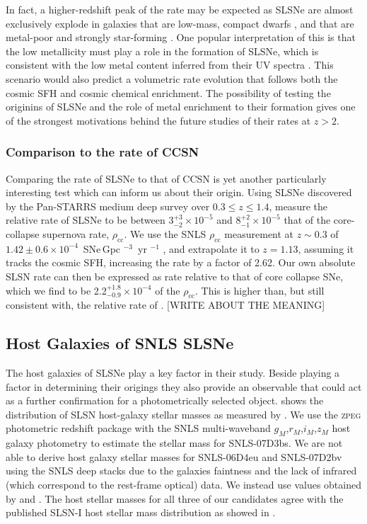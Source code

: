 In fact, a higher-redshift peak of the rate may be expected as SLSNe are almost exclusively explode in galaxies that are low-mass, compact dwarfs \citep{2011ApJ...727...15N,2015ApJ...804...90L}, and that are metal-poor and strongly star-forming \citep{2013ApJ...771...97L,2013ApJ...763L..28C,2015MNRAS.449..917L}. One popular interpretation of this is that the low metallicity must play a role in the formation of SLSNe, which is consistent with the low metal content inferred from their UV spectra \citep{Mazzalli2016}. This scenario would also predict a volumetric rate evolution that follows both the cosmic SFH and cosmic chemical enrichment. The possibility of testing the originins of SLSNe and the role of metal enrichment to their formation gives one of the strongest motivations behind the future studies of their rates at $z>2$.

\subsubsection{Comparison to the rate of CCSN}
Comparing the rate of SLSNe to that of CCSN is yet another particularly interesting test which can inform us about their origin. Using SLSNe discovered by the Pan-STARRS medium deep survey over $0.3 \leq z \leq 1.4$, \citet{McCrum2015} measure the relative rate of SLSNe to be between $3^{+3}_{-2}\times10^{-5}$ and $8^{+2}_{-1}\times10^{-5}$ that of the core-collapse supernova rate, $\rho_{\mathrm{cc}}$. We use the SNLS $\rho_{\mathrm{cc}}$ measurement at $z\sim0.3$ of $1.42\pm0.6\times10^{-4}$ \,SNe\,Gpc $^{-3}$ \,yr $^{-1}$ \citep{2009A&A...499..653B}, and extrapolate it to $z=1.13$, assuming it tracks the cosmic SFH, increasing the rate by a factor of 2.62. Our own absolute SLSN rate can then be expressed as rate relative to that of core collapse SNe, which we find to be 2.2$^{+1.8}_{-0.9}\times10^{-4}$ of the $\rho_{\mathrm{cc}}$. This is higher than, but still consistent with, the relative rate of \citet{2015MNRAS.448.1206M}. [WRITE ABOUT THE MEANING]

\subsection{Host Galaxies of SNLS SLSNe}
The host galaxies of SLSNe play a key factor in their study. Beside playing a factor in determining their origings they also provide an observable that could act as a further confirmation for a photometrically selected object.  shows the distribution of SLSN host-galaxy stellar masses as measured by \cite{Lunnan2014}. We use the \textsc{zpeg} photometric redshift package \citep{2002A&amp;A...386..446L} with the SNLS multi-waveband $g_M$,$r_M$,$i_M$,$z_M$ host galaxy photometry to estimate the stellar mass for SNLS-07D3bs. We are not able to derive host galaxy stellar masses for SNLS-06D4eu and SNLS-07D2bv using the SNLS deep stacks due to the galaxies faintness and the lack of infrared (which correspond to the rest-frame optical) data. We instead use values obtained by \citet{Leloudas2015a} and \citet{Schulze2017}. The host stellar masses for all three of our candidates agree with the published SLSN-I host stellar mass distribution as showed in .

